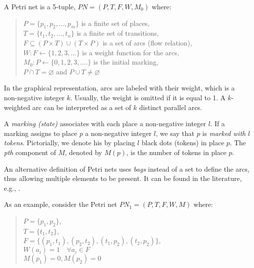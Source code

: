 \begin{definition}
    A Petri net is a 5-tuple, $ PN = (P, T, F, W, M_{0}) $ where:

    \begin{quote}
        $ P = \{ p_1, p_2, \dots, p_m \} $ is a finite set of places,\\
        $ T = \{ t_1, t_2, \dots, t_n \} $ is a finite set of transitions,\\
        $ F \subseteq (P \times T) \cup (T \times P) $ is a set of arcs (flow relation),\\
        $ W: F \leftarrow \{1, 2, 3, ... \} $ is a weight function for the arcs,\\
        $ M_{0}: P \leftarrow \{0, 1, 2, 3, .... \} $ is the initial marking,\\
        $ P \cap T = \varnothing $ and $ P \cup T \neq \varnothing $
    \end{quote}
\end{definition}

In the graphical representation, arcs are labeled with their weight, which is a non-negative integer $k$.
Usually, the weight is omitted if it is equal to 1.
A $k$-weighted arc can be interpreted as a set of $k$ distinct parallel arcs.

A \textit{marking (state)} associates with each place a non-negative integer $l$.
If a marking assigns to place $p$ a non-negative integer $l$, we say that $p$ is \textit{marked with $l$ tokens}.
Pictorially, we denote his by placing $l$ black dots (tokens) in place $p$.
The \textit{pth} component of $M$, denoted by $M(p)$, is the number of tokens in place $p$.

An alternative definition of Petri nets uses \textit{bags} instead of a set to define the arcs,
thus allowing multiple elements to be present.
It can be found in the literature, e.g., \cite[Definition 2.3]{peterson1981}.

As an example, consider the Petri net $ PN_{1} = (P, T, F, W, M) $ where:

\begin{quote}
    $ P = \{ p_1, p_2 \} $,\\
    $ T = \{ t_1, t_2 \} $,\\
    $ F = \{ (p_1, t_1), (p_2, t_2), (t_1, p_2), (t_2, p_2) \} $,\\
    $ W(a_i) = 1 \quad \forall a_i \in F $\\
    $ M(p_1) = 0, M(p_2) = 0 $
\end{quote}

